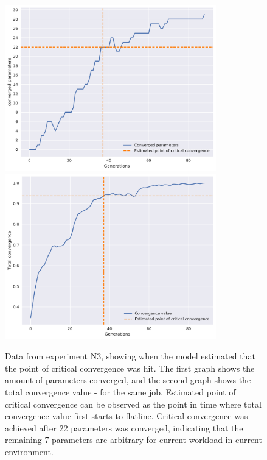 \documentclass[a4paper,english]{report}
\begin{document}
		\begin{figure}[H]
			\centering
			\includegraphics[width=260pt]{est11}
			\includegraphics[width=260pt]{est12}
			\caption{Data from experiment N3, showing when the model estimated that the point of critical convergence was hit. The first graph shows the amount of parameters converged, and the second graph shows the total convergence value - for the same job. Estimated point of critical convergence can be observed as the point in time where total convergence value first starts to flatline. Critical convergence was achieved after 22 parameters was converged, indicating that the remaining 7 parameters are arbitrary for current workload in current environment.}
			\label{fig:estimation1}
		\end{figure}
\end{document}
